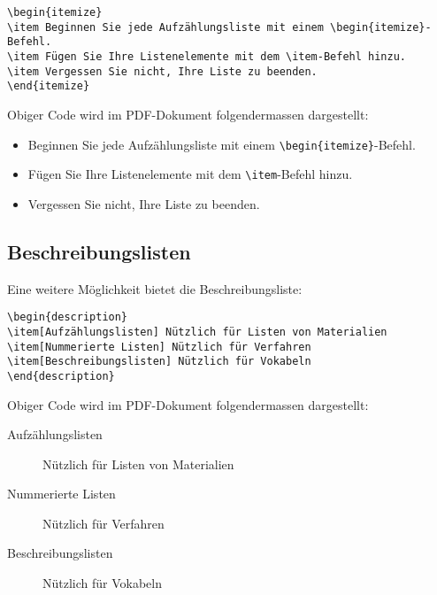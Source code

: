 \begin{verbatim}
\begin{itemize}
\item Beginnen Sie jede Aufzählungsliste mit einem \begin{itemize}-Befehl.
\item Fügen Sie Ihre Listenelemente mit dem \item-Befehl hinzu.
\item Vergessen Sie nicht, Ihre Liste zu beenden.
\end{itemize}
\end{verbatim}
Obiger Code wird im PDF-Dokument folgendermassen dargestellt:
\begin{itemize}
\item Beginnen Sie jede Aufzählungsliste mit einem \verb|\begin{itemize}|-Befehl.
\item Fügen Sie Ihre Listenelemente mit dem \verb|\item|-Befehl hinzu.
\item Vergessen Sie nicht, Ihre Liste zu beenden.
\end{itemize}


\subsection{Beschreibungslisten}
Eine weitere Möglichkeit bietet die Beschreibungsliste:
\begin{verbatim}
\begin{description}
\item[Aufzählungslisten] Nützlich für Listen von Materialien
\item[Nummerierte Listen] Nützlich für Verfahren
\item[Beschreibungslisten] Nützlich für Vokabeln
\end{description}
\end{verbatim}
Obiger Code wird im PDF-Dokument folgendermassen dargestellt:

\begin{description}
\item[Aufzählungslisten] Nützlich für Listen von Materialien
\item[Nummerierte Listen] Nützlich für Verfahren
\item[Beschreibungslisten] Nützlich für Vokabeln
\end{description}

